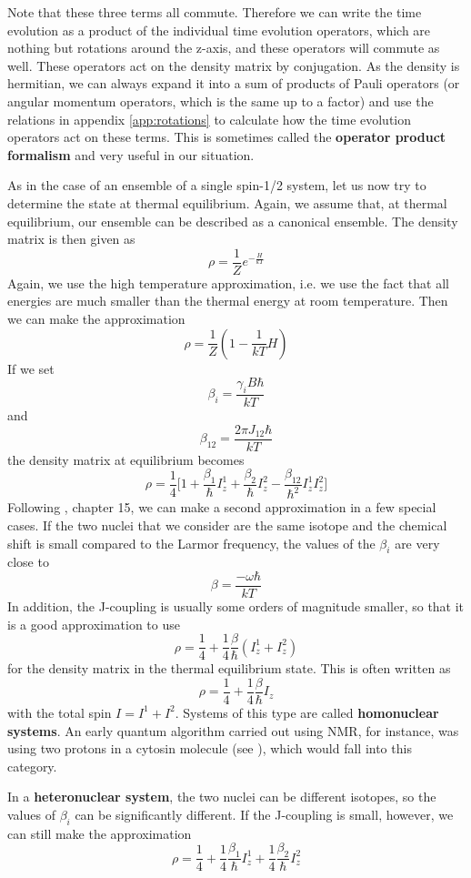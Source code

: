 \documentclass[a4paper, draft]{article}
\theoremstyle{own}
\theoremstyle{remark}
\begin{document}
Note that these three terms all commute. Therefore we can write the time evolution as a product of the individual time evolution operators, which are nothing but rotations around the z-axis, and these operators will commute as well. These operators act on the density matrix by conjugation. As the density is hermitian, we can always expand it into a sum of products of Pauli operators (or angular momentum operators, which is the same up to a factor) and use the relations in appendix \ref{app:rotations} to calculate how the time evolution operators act on these terms. This is sometimes called the {\bf operator product formalism} and very useful in our situation. 

As in the case of an ensemble of a single spin-1/2 system, let us now try to determine the state at thermal equilibrium. Again, we assume that, at thermal equilibrium, our ensemble can be described as a canonical ensemble. The density matrix is then given as
$$
\rho = \frac{1}{Z} e^{-\frac{H}{kT}}
$$
Again, we use the high temperature approximation, i.e. we use the fact that all energies are much smaller than the thermal energy at room temperature. Then we can make the approximation
$$
\rho = \frac{1}{Z} (1 - \frac{1}{kT} H)
$$
If we set
$$
\beta_i = \frac{\gamma_i  B \hbar}{kT}
$$
and
$$
\beta_{12} = \frac{2\pi J_{12} \hbar}{kT}
$$
the density matrix at equilibrium becomes
$$
\rho = \frac{1}{4} \big[  1 + \frac{\beta_1}{\hbar} I^1_z + \frac{\beta_2}{\hbar} I^2_z - \frac{\beta_{12}}{\hbar^2} I_z^1 I_z^2 \big] 
$$
Following \cite{Levitt}, chapter 15, we can make a second approximation in a few special cases. If the two nuclei that we consider are the same isotope and the chemical shift is small compared to the Larmor frequency, the values of the $\beta_i$ are very close to
$$
\beta = \frac{-\omega \hbar}{kT}
$$
In addition, the J-coupling is usually some orders of magnitude smaller, so that it is a good approximation to use
$$
\rho = \frac{1}{4} + \frac{1}{4} \frac{\beta}{\hbar} (I_z^1 + I_z^2)
$$
for the density matrix in the thermal equilibrium state. This is often written as
$$
\rho = \frac{1}{4} + \frac{1}{4} \frac{\beta}{\hbar} I_z
$$
with the total spin $I = I^1 + I^2$. Systems of this type are called {\bf homonuclear systems}. An early quantum algorithm carried out using NMR, for instance, was using two protons in a cytosin molecule (see \cite{JonesMosca}), which would fall into this category. 

In a {\bf heteronuclear system}, the two nuclei can be different isotopes, so the values of $\beta_i$ can be significantly different. If the J-coupling is small, however, we can still make the approximation
$$
\rho = \frac{1}{4} + \frac{1}{4} \frac{\beta_1}{\hbar} I_z^1 + \frac{1}{4} \frac{\beta_2}{\hbar} I_z^2
$$
\end{document}
